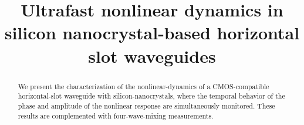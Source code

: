 \documentclass[conference]{IEEEtran}
\begin{document}
%
\title{Ultrafast nonlinear dynamics in silicon nanocrystal-based horizontal slot waveguides}



\author{
}


\maketitle


\begin{abstract}  %

We present the characterization of the nonlinear-dynamics of a CMOS-compatible horizontal-slot waveguide with silicon-nanocrystals, where the temporal behavior of the phase and amplitude of the nonlinear response are simultaneously monitored. These results are complemented with four-wave-mixing measurements.


\end{abstract}





%
\IEEEpeerreviewmaketitle
\end{document}

